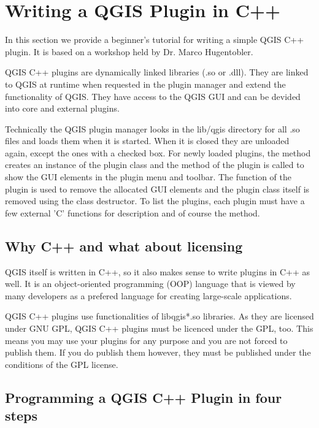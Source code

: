 \section{Writing a QGIS Plugin in C++}\label{cpp_plugin}


In this section we provide a beginner's tutorial for writing a simple QGIS
C++ plugin. It is based on a workshop held by Dr. Marco Hugentobler. 

QGIS C++ plugins are dynamically linked libraries (.so or .dll). They are
linked to QGIS at runtime when requested in the plugin manager and extend the
functionality of QGIS. They have access to the QGIS GUI and can be devided
into core and external plugins.

Technically the QGIS plugin manager looks in the lib/qgis directory for all
.so files and loads them when it is started. When it is closed they are
unloaded again, except the ones with a checked box. For newly loaded plugins,
the  method creates an instance of the plugin class and
the  method of the plugin is called to show the GUI elements
in the plugin menu and toolbar. The  function of the plugin
is used to remove the allocated GUI elements and the plugin class itself is
removed using the class destructor. To list the plugins, each plugin must
have a few external 'C' functions for description and of course the
 method.

\subsection{Why C++ and what about licensing}

QGIS itself is written in C++, so it also makes sense to write plugins in C++
as well. It is an object-oriented programming (OOP) language that is viewed
by many developers as a prefered language for creating large-scale
applications.

QGIS C++ plugins use functionalities of libqgis*.so libraries. As they are
licensed under GNU GPL, QGIS C++ plugins must be licenced under the GPL, too.
This means you may use your plugins for any purpose and you are not forced to
publish them. If you do publish them however, they must be published under
the conditions of the GPL license. 

\subsection{Programming a QGIS C++ Plugin in four steps}

